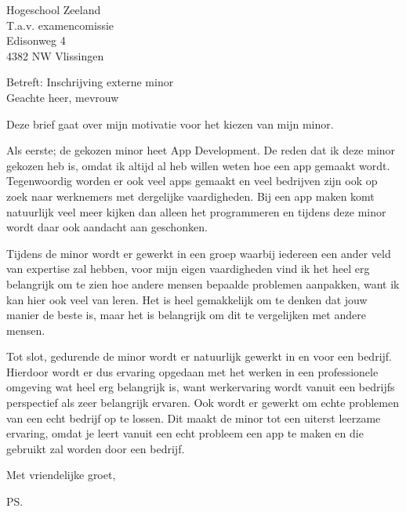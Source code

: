 \documentclass{letter}
\begin{document}
\begin{letter}{Hogeschool Zeeland \\ T.a.v. examencomissie \\ Edisonweg 4 \\ 4382 NW Vlissingen}

\opening{Betreft: Inschrijving externe minor \\ Geachte heer, mevrouw}

Deze brief gaat over mijn motivatie voor het kiezen van mijn minor.

Als eerste; de gekozen minor heet App Development. De reden dat ik deze minor gekozen heb is, omdat ik altijd al heb willen weten hoe een app gemaakt wordt. Tegenwoordig worden er ook veel apps gemaakt en veel bedrijven zijn ook op zoek naar werknemers met dergelijke vaardigheden. Bij een app maken komt natuurlijk veel meer kijken dan alleen het programmeren en tijdens deze minor wordt daar ook aandacht aan geschonken.

\newline

Tijdens de minor wordt er gewerkt in een groep waarbij iedereen een ander veld van expertise zal hebben, voor mijn eigen vaardigheden vind ik het heel erg belangrijk om te zien hoe andere mensen bepaalde problemen aanpakken, want ik kan hier ook veel van leren. Het is heel gemakkelijk om te denken dat jouw manier de beste is, maar het is belangrijk om dit te vergelijken met andere mensen.

\newline

Tot slot, gedurende de minor wordt er natuurlijk gewerkt in en voor een bedrijf. Hierdoor wordt er dus ervaring opgedaan met het werken in een professionele omgeving wat heel erg belangrijk is, want werkervaring wordt vanuit een bedrijfs perspectief als zeer belangrijk ervaren. Ook wordt er gewerkt om echte problemen van een echt bedrijf op te lossen. Dit maakt de minor tot een uiterst leerzame ervaring, omdat je leert vanuit een echt probleem een app te maken en die gebruikt zal worden door een bedrijf.


\closing{Met vriendelijke groet, }
\ps

\end{letter}
\end{document}
